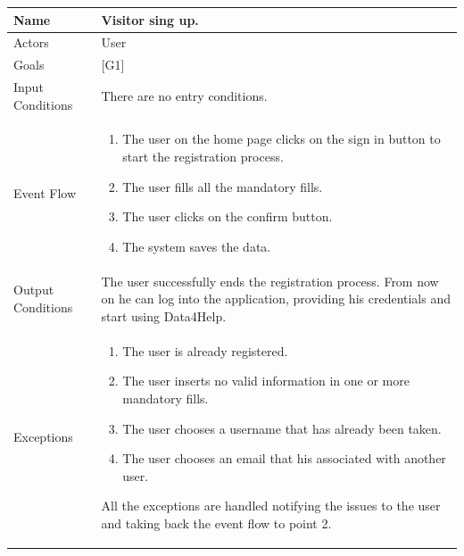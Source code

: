 \documentclass{article}
\begin{document}
\begin{center}
    \begin{tabular}{ | l | p{10cm} |}
    \hline
    Name & Visitor sing up.\\ \hline
    Actors & User\\ \hline
   	Goals & {[G1]}\\ \hline
    Input Conditions & There are no entry conditions.\\ \hline
    Event Flow & \begin{enumerate}
    	\item The user on the home page clicks on the sign in button to start the registration process.
    	\item The user fills all the mandatory fills.
		\item The user clicks on the confirm button.
		\item The system saves the data.
    \end{enumerate} \\ \hline
    Output Conditions & The user successfully ends the registration process. From now on he can log into the application, providing his credentials and start using Data4Help. \\ \hline
    Exceptions & \begin{enumerate}
    	\item The user is already registered.
		\item The user inserts no valid information in one or more mandatory fills.
		\item The user chooses a username that has already been taken. 
		\item The user chooses an email that his associated with another user.
	\end{enumerate}
All the exceptions are handled notifying the issues to the user and taking back the event flow to point 2.
    \\ \hline
    \end{tabular}
\end{center}
\end{document}
